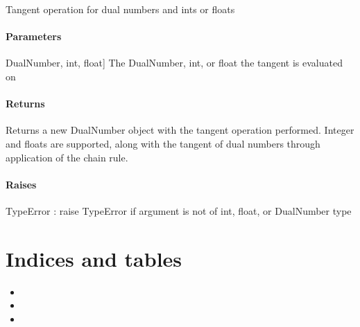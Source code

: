 \documentclass[letterpaper,10pt,english]{sphinxmanual}
\begin{document}
\begin{fulllineitems}
\label{\detokenize{autodiff:autodiff.tan}}
\pysigstartsignatures
{}
\pysigstopsignatures
\sphinxAtStartPar
Tangent operation for dual numbers and ints or floats


\subsubsection{Parameters}
\label{\detokenize{autodiff:id63}}\begin{description}
\sphinxlineitem{x}{[}DualNumber, int, float{]}
\sphinxAtStartPar
The DualNumber, int, or float the tangent is evaluated on

\end{description}


\subsubsection{Returns}
\label{\detokenize{autodiff:id64}}\begin{description}
\sphinxAtStartPar
Returns a new DualNumber object with the tangent operation performed. Integer and
floats are supported, along with the tangent of dual numbers through application 
of the chain rule.

\end{description}


\subsubsection{Raises}
\label{\detokenize{autodiff:id65}}
\sphinxAtStartPar
TypeError : raise TypeError if argument is not of int, float, or DualNumber type

\end{fulllineitems}



\chapter{Indices and tables}
\label{\detokenize{index:indices-and-tables}}\begin{itemize}
\item {} 
\sphinxAtStartPar
{}

\item {} 
\sphinxAtStartPar
{}

\item {} 
\sphinxAtStartPar
{}

\end{itemize}
\end{document}
